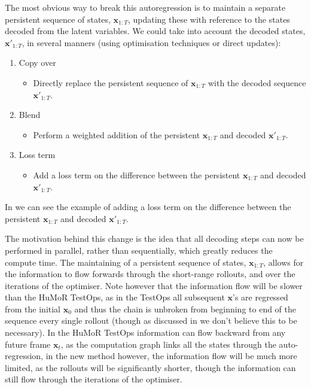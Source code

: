 The most obvious way to break this autoregression is to maintain a separate persistent sequence of states, $\mathbf{x}_{1:T}$, updating these with reference to the states decoded from the latent variables. We could take into account the decoded states, $\mathbf{x'}_{1:T}$, in several manners (using optimisation techniques or direct updates):
\begin{enumerate}
    \item Copy over
    \begin{itemize}
        \item Directly replace the persistent sequence of $\mathbf{x}_{1:T}$ with the decoded sequence $\mathbf{x'}_{1:T}$.
    \end{itemize}
    \item Blend
    \begin{itemize}
        \item Perform a weighted addition of the persistent $\mathbf{x}_{1:T}$ and decoded $\mathbf{x'}_{1:T}$.
    \end{itemize}
    \item Loss term
    \begin{itemize}
        \item Add a loss term on the difference between the persistent $\mathbf{x}_{1:T}$ and decoded $\mathbf{x'}_{1:T}$. 
    \end{itemize}
\end{enumerate}

In  we can see the example of adding a loss term on the difference between the persistent $\mathbf{x}_{1:T}$ and decoded $\mathbf{x'}_{1:T}$.

The motivation behind this change is the idea that all decoding steps can now be performed in parallel, rather than sequentially, which greatly reduces the compute time. The maintaining of a persistent sequence of states, $\mathbf{x}_{1:T}$, allows for the information to flow forwards through the short-range rollouts, and over the iterations of the optimiser. Note however that the information flow will be slower than the HuMoR TestOps, as in the TestOps all subsequent $\mathbf{x}$'s are regressed from the initial $\mathbf{x}_0$ and thus the chain is unbroken from beginning to end of the sequence every single rollout (though as discussed in  we don't believe this to be necessary). In the HuMoR TestOps information can flow backward from any future frame $\mathbf{x}_t$, as the computation graph links all the states through the auto-regression, in the new method however, the information flow will be much more limited, as the rollouts will be significantly shorter, though the information can still flow through the iterations of the optimiser.

